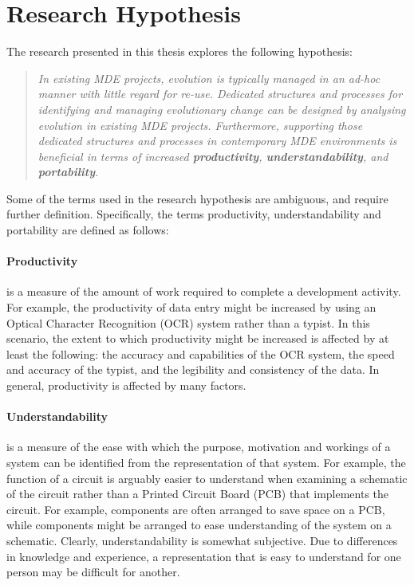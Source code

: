 
\section{Research Hypothesis}
The research presented in this thesis explores the following hypothesis:

\begin{quote}
\emph{In existing MDE projects, evolution is typically managed in an ad-hoc manner with little regard for re-use. Dedicated structures and processes for identifying and managing evolutionary change can be designed by analysing evolution in existing MDE projects. Furthermore, supporting those dedicated structures and processes in contemporary MDE environments is beneficial in terms of increased \textbf{productivity}, \textbf{understandability}, and \textbf{portability}.}
\end{quote}

Some of the terms used in the research hypothesis are ambiguous, and require further definition. Specifically, the terms productivity, understandability and portability are defined as follows:

\paragraph{Productivity} is a measure of the amount of work required to complete a development activity. For example, the productivity of data entry might be increased by using an Optical Character Recognition (OCR) system rather than a typist. In this scenario, the extent to which productivity might be increased is affected by at least the following: the accuracy and capabilities of the OCR system, the speed and accuracy of the typist, and the legibility and consistency of the data. In general, productivity is affected by many factors.


\paragraph{Understandability} is a measure of the ease with which the purpose, motivation and workings of a system can be identified from the representation of that system. For example, the function of a circuit is arguably easier to understand when examining a schematic of the circuit rather than a Printed Circuit Board (PCB) that implements the circuit. For example, components are often arranged to save space on a PCB, while components might be arranged to ease understanding of the system on a schematic. Clearly, understandability is somewhat subjective. Due to differences in knowledge and experience, a representation that is easy to understand for one person may be difficult for another. 


